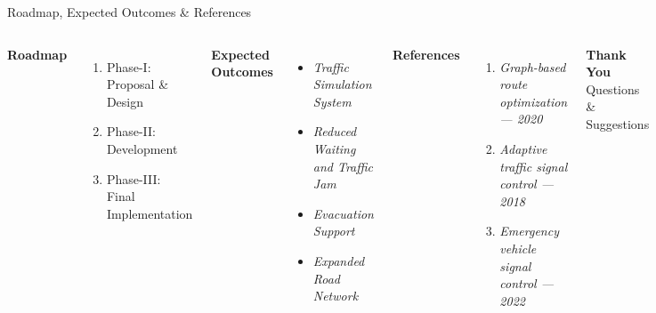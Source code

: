\documentclass[aspectratio=169,11pt]{beamer}
\newcommand{\placeholder}[1]{\textit{\color{GEUGrey}#1}}
\begin{document}
\begin{frame}{Roadmap, Expected Outcomes \& References}
\begin{columns}[T,totalwidth=\textwidth]
\textbf{\color{GEUBlue}Roadmap}
\begin{enumerate}\itemsep3pt
\item Phase-I: Proposal \& Design
\item Phase-II: Development
\item Phase-III: Final Implementation
\end{enumerate}
\vspace{2mm}
\textbf{\color{GEUBlue}Expected Outcomes}
\begin{itemize}\itemsep2pt
\item \placeholder{Traffic Simulation System}
\item \placeholder{Reduced Waiting and Traffic Jam}
\item \placeholder{Evacuation Support}
\item \placeholder{Expanded Road Network}
\end{itemize}
\textbf{\color{GEUBlue}References}
\begin{enumerate}\itemsep1pt
\item \placeholder{Graph-based route optimization — 2020}
\item \placeholder{Adaptive traffic signal control — 2018}
\item \placeholder{Emergency vehicle signal control — 2022}
\end{enumerate}
\vfill
\begin{center}
\colorbox{GEUBlue}{\parbox{.78\textwidth}{\centering\color{white}\textbf{Thank You}\\Questions \& Suggestions}}
\end{center}
\end{columns}
\end{frame}
\end{document}
